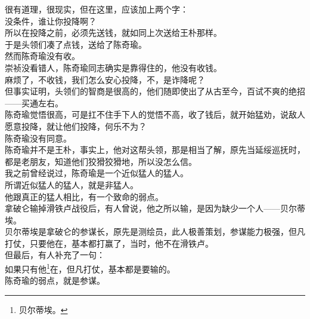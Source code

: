 \begin{multicols}{\theparacolNo}
很有道理，很现实，但在这里，应该加上两个字：\\

没条件，谁让你投降啊？\\

所以在投降之前，必须先送钱，就如同上次送给王朴那样。\\

于是头领们凑了点钱，送给了陈奇瑜。\\

然而陈奇瑜没有收。\\

崇祯没看错人，陈奇瑜同志确实是靠得住的，他没有收钱。\\

麻烦了，不收钱，我们怎么安心投降，不，是诈降呢？\\

但事实证明，头领们的智商是很高的，他们随即使出了从古至今，百试不爽的绝招——买通左右。\\

陈奇瑜觉悟很高，可是扛不住手下人的觉悟不高，收了钱后，就开始猛劝，说敌人愿意投降，就让他们投降，何乐不为？\\

陈奇瑜没有同意。\\

陈奇瑜并不是王朴，事实上，他对这帮头领，那是相当了解，原先当延绥巡抚时，都是老朋友，知道他们狡猾狡猾地，所以没怎么信。\\

我之前曾经说过，陈奇瑜是一个近似猛人的猛人。\\

所谓近似猛人的猛人，就是非猛人。\\

他跟真正的猛人相比，有一个致命的弱点。\\

拿破仑输掉滑铁卢战役后，有人曾说，他之所以输，是因为缺少一个人——贝尔蒂埃。\\

贝尔蒂埃是拿破仑的参谋长，原先是测绘员，此人极善策划，参谋能力极强，但凡打仗，只要他在，基本都打赢了，当时，他不在滑铁卢。\\

但最后，有人补充了一句：\\

如果只有他\footnote{贝尔蒂埃。}在，但凡打仗，基本都是要输的。\\

陈奇瑜的弱点，就是参谋。\\


\end{multicols}
